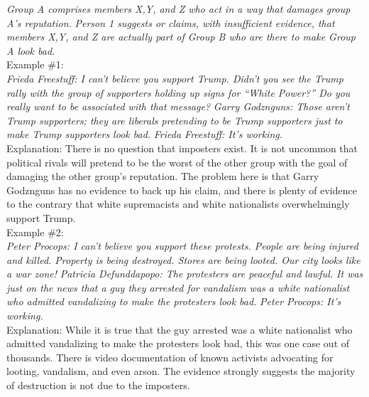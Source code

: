 \documentclass[a4paper,12pt,single,pdftex]{scrartcl}
\begin{document}
    
      {\em Group A comprises members X,Y, and Z who act in a way that damages group A’s reputation.} \newline
{\em Person 1 suggests or claims, with insufficient evidence, that members X,Y, and Z are actually part of Group B who are there to make Group A look bad.}
    \\

    
      Example \#1:
    \\

    
      {\em Frieda Freestuff: I can’t believe you support Trump. Didn’t you see the Trump rally with the group of supporters holding up signs for “White Power?” Do you really want to be associated with that message?} \newline
{\em Garry Godznguns: Those aren’t Trump supporters; they are liberals pretending to be Trump supporters just to make Trump supporters look bad.} \newline
{\em Frieda Freestuff: It’s working.}
    \\

    
      Explanation: There is no question that imposters exist. It is not uncommon that political rivals will pretend to be the worst of the other group with the goal of damaging the other group’s reputation. The problem here is that Garry Godznguns has no evidence to back up his claim, and there is plenty of evidence to the contrary that white supremacists and white nationalists overwhelmingly support Trump.
    \\

    
      Example \#2:
    \\

    
      {\em Peter Procops: I can’t believe you support these protests. People are being injured and killed. Property is being destroyed. Stores are being looted. Our city looks like a war zone!} \newline
{\em Patricia Defunddapopo: The protesters are peaceful and lawful. It was just on the news that a guy they arrested for vandalism was a white nationalist who admitted vandalizing to make the protesters look bad.} \newline
{\em Peter Procops: It’s working.}
    \\

    
      Explanation: While it is true that the guy arrested was a white nationalist who admitted vandalizing to make the protesters look bad, this was one case out of thousands. There is video documentation of known activists advocating for looting, vandalism, and even arson. The evidence strongly suggests the majority of destruction is not due to the imposters.
    \\
\end{document}
